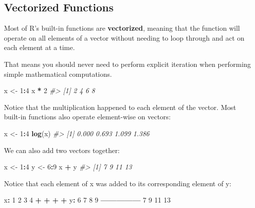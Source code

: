 \documentclass[]{book}
\newenvironment{Shaded}{\begin{snugshade}}{\end{snugshade}}
\newcommand{\CommentTok}[1]{\textcolor[rgb]{0.56,0.35,0.01}{\textit{#1}}}
\newcommand{\DecValTok}[1]{\textcolor[rgb]{0.00,0.00,0.81}{#1}}
\newcommand{\KeywordTok}[1]{\textcolor[rgb]{0.13,0.29,0.53}{\textbf{#1}}}
\newcommand{\NormalTok}[1]{#1}
\newcommand{\OperatorTok}[1]{\textcolor[rgb]{0.81,0.36,0.00}{\textbf{#1}}}
\newcommand{\StringTok}[1]{\textcolor[rgb]{0.31,0.60,0.02}{#1}}
\begin{document}
\hypertarget{vectorized-functions}{%
\subsection{Vectorized Functions}\label{vectorized-functions}}

Most of R's built-in functions are \textbf{vectorized}, meaning that the function will operate on all elements of a vector without needing to loop through and act on each element at a time.

That means you should never need to perform explicit iteration when performing simple mathematical computations.

\begin{Shaded}
\begin{Highlighting}[]
\NormalTok{x <-}\StringTok{ }\DecValTok{1}\OperatorTok{:}\DecValTok{4}
\NormalTok{x }\OperatorTok{*}\StringTok{ }\DecValTok{2}
\CommentTok{#> [1] 2 4 6 8}
\end{Highlighting}
\end{Shaded}

Notice that the multiplication happened to each element of the vector. Most built-in functions also operate element-wise on vectors:

\begin{Shaded}
\begin{Highlighting}[]
\NormalTok{x <-}\StringTok{ }\DecValTok{1}\OperatorTok{:}\DecValTok{4}
\KeywordTok{log}\NormalTok{(x)}
\CommentTok{#> [1] 0.000 0.693 1.099 1.386}
\end{Highlighting}
\end{Shaded}

We can also add two vectors together:

\begin{Shaded}
\begin{Highlighting}[]
\NormalTok{x <-}\StringTok{ }\DecValTok{1}\OperatorTok{:}\DecValTok{4}
\NormalTok{y <-}\StringTok{ }\DecValTok{6}\OperatorTok{:}\DecValTok{9}
\NormalTok{x }\OperatorTok{+}\StringTok{ }\NormalTok{y}
\CommentTok{#> [1]  7  9 11 13}
\end{Highlighting}
\end{Shaded}

Notice that each element of x was added to its corresponding element of y:

\begin{Shaded}
\begin{Highlighting}[]
\NormalTok{x}\OperatorTok{:}\StringTok{  }\DecValTok{1}  \DecValTok{2}  \DecValTok{3}  \DecValTok{4}
    \OperatorTok{+}\StringTok{  }\OperatorTok{+}\StringTok{  }\OperatorTok{+}\StringTok{  }\OperatorTok{+}
\NormalTok{y}\OperatorTok{:}\StringTok{  }\DecValTok{6}  \DecValTok{7}  \DecValTok{8}  \DecValTok{9}
\OperatorTok{---------------}
\StringTok{    }\DecValTok{7}  \DecValTok{9} \DecValTok{11} \DecValTok{13}
\end{Highlighting}
\end{Shaded}
\end{document}
